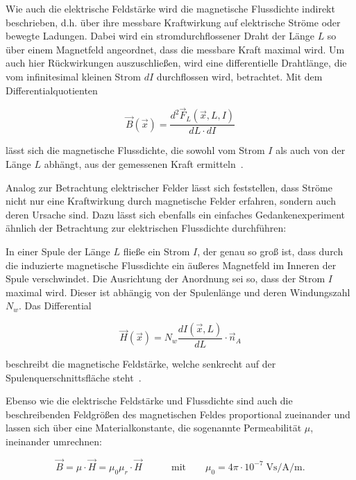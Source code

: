 Wie auch die elektrische Feldstärke wird die magnetische Flussdichte indirekt beschrieben, d.h. über ihre messbare Kraftwirkung auf elektrische Ströme oder bewegte Ladungen. Dabei wird ein stromdurchflossener Draht der Länge $L$ so über einem Magnetfeld angeordnet, dass die messbare Kraft maximal wird. Um auch hier Rückwirkungen auszuschließen, wird eine differentielle Drahtlänge, die vom infinitesimal kleinen Strom $dI$ durchflossen wird, betrachtet. Mit dem Differentialquotienten

\begin{equation}
    \vec B(\vec x) = \frac{d^2 \vec F_L(\vec x,L,I)}{dL \cdot dI}
\end{equation}

lässt sich die magnetische Flussdichte, die sowohl vom Strom $I$ als auch von der Länge $L$ abhängt, aus der gemessenen Kraft ermitteln~\cite{EM_Schirmung}. 
\par
\vspace{\linespace}
Analog zur Betrachtung elektrischer Felder lässt sich feststellen, dass Ströme nicht nur eine Kraftwirkung durch magnetische Felder erfahren, sondern auch deren Ursache sind. Dazu lässt sich ebenfalls ein einfaches Gedankenexperiment ähnlich der Betrachtung zur elektrischen Flussdichte durchführen: 
\par
\vspace{\linespace}
In einer Spule der Länge $L$ fließe ein Strom $I$, der genau so groß ist, dass durch die induzierte magnetische Flussdichte ein äußeres Magnetfeld im Inneren der Spule verschwindet. Die Ausrichtung der Anordnung sei so, dass der Strom $I$ maximal wird. Dieser ist abhängig von der Spulenlänge und deren Windungszahl $N_w$. Das Differential

\begin{equation}
    \vec H(\vec x) = N_w \frac{dI(\vec x,L)}{dL} \cdot \vec n_A
\end{equation}

beschreibt die magnetische Feldstärke, welche senkrecht auf der Spulenquerschnittsfläche steht~\cite{EM_Schirmung}. 
\par
\vspace{\linespace}
Ebenso wie die elektrische Feldstärke und Flussdichte sind auch die beschreibenden Feldgrößen des \mbox{magnetischen} Feldes proportional zueinander und lassen sich über eine Materialkonstante, die sogenannte Permeabilität $\mu$, ineinander umrechnen:

\begin{equation}
    \vec B = \mu \cdot \vec H = \mu_0 \mu_r \cdot \vec H \qquad \quad \text{mit} \qquad \mu_0 = 4 \pi \cdot 10^{-7} \; \si{\volt\second\per\ampere\per\meter}.
    \label{eq:2_Materialgleichung_magnetisches_Feld}
\end{equation}

